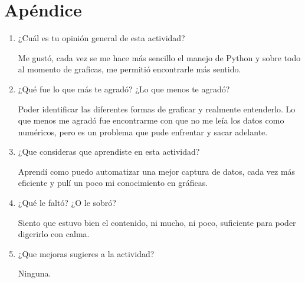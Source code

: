 \documentclass[a4paper]{article}
\begin{document}
\section{Apéndice}
\begin{enumerate}
\item ¿Cuál es tu opinión general de esta actividad?

Me gustó, cada vez se me hace más sencillo el manejo de Python y sobre todo al momento de graficas, me permitió encontrarle más sentido.

\item ¿Qué fue lo que más te agradó? ¿Lo que menos te agradó?

Poder identificar las diferentes formas de graficar y realmente entenderlo. Lo que menos me agradó fue encontrarme con que no me leía los datos como numéricos, pero es un problema que pude enfrentar y sacar adelante.

\item ¿Que consideras que aprendiste en esta actividad? 

Aprendí como puedo automatizar una mejor captura de datos, cada vez más eficiente y pulí un poco mi conocimiento en gráficas.

\item ¿Qué le faltó? ¿O le sobró?  

Siento que estuvo bien el contenido, ni mucho, ni poco, suficiente para poder digerirlo con calma.

\item ¿Que mejoras sugieres a la actividad?

Ninguna. 

\end{enumerate}

%
\end{document}
